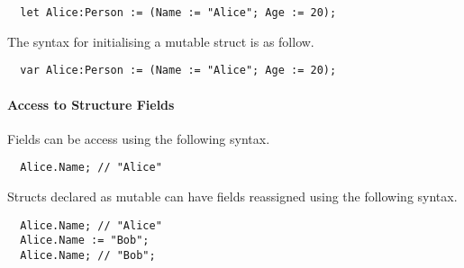 \begin{verbatim}
  let Alice:Person := (Name := "Alice"; Age := 20);
\end{verbatim}

The syntax for initialising a mutable struct is as follow.

\begin{verbatim}
  var Alice:Person := (Name := "Alice"; Age := 20);
\end{verbatim}

\paragraph{Access to Structure Fields}
\label{sec:accessStructFields}

Fields can be access using the following syntax.

\begin{verbatim}
  Alice.Name; // "Alice"
\end{verbatim}

Structs declared as mutable can have fields reassigned using the following syntax.

\begin{verbatim}
  Alice.Name; // "Alice"
  Alice.Name := "Bob";
  Alice.Name; // "Bob";
\end{verbatim}
